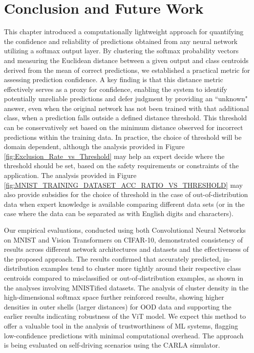\section{Conclusion and Future Work}

This chapter introduced a computationally lightweight approach for quantifying the confidence and reliability of predictions obtained from any neural network utilizing a softmax output layer. By clustering the softmax probability vectors and measuring the Euclidean distance between a given output and class centroids derived from the mean of correct predictions, we established a practical metric for assessing prediction confidence. A key finding is that this distance metric effectively serves as a proxy for confidence, enabling the system to identify potentially unreliable predictions and defer judgment by providing an ``unknown" answer, even when the original network has not been trained with that additional class, when a prediction falls outside a defined distance threshold. This threshold can be conservatively set based on the minimum distance observed for incorrect predictions within the training data. In practice, the choice of threshold will be domain dependent, although the analysis provided in Figure \ref{fig:Exclusion_Rate_vs_Threshold} may help an expert decide where the threshold should be set, based on the safety requirements or constraints of the application. The analysis provided in Figure \ref{fig:MNIST_TRAINING_DATASET_ACC_RATIO_VS_THRESHOLD} may also provide subsidies for the choice of threshold in the case of out-of-distribution data when expert knowledge is available comparing different data sets (or in the case where the data can be separated as with English digits and characters).

Our empirical evaluations, conducted using both Convolutional Neural Networks on MNIST and Vision Transformers on CIFAR-10, demonstrated consistency of results across different network architectures and datasets and the effectiveness of the proposed approach. The results confirmed that accurately predicted, in-distribution examples tend to cluster more tightly around their respective class centroids compared to misclassified or out-of-distribution examples, as shown in the analyses involving MNISTified datasets. The analysis of cluster density in the high-dimensional softmax space further reinforced results, showing higher densities in outer shells (larger distances) for OOD data and supporting the earlier results indicating robustness of the ViT model. We expect this method to offer a valuable tool in the analysis of trustworthiness of ML systems, flagging low-confidence predictions with minimal computational overhead. The approach is being evaluated on self-driving scenarios using the CARLA simulator.


